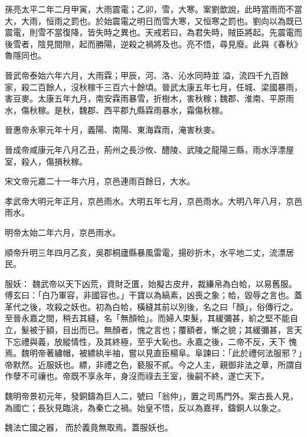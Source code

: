 \begin{pinyinscope}
 孫亮太平二年二月甲寅，大雨震電；乙卯，雪，大寒。案劉歆說，此時當雨而不當大，大雨，恒雨之罰也。於始震電之明日而雪大寒，又恒寒之罰也。劉向以為既已震電，則雪不當復降，皆失時之異也。天戒若曰，為君失時，賊臣將起。先震電而後雪者，陰見間隙，起而勝陽，逆殺之禍將及也。亮不悟，尋見廢。此與《春秋》魯隱同也。



 晉武帝泰始六年六月，大雨霖；甲辰，河、洛、沁水同時並
 溢，流四千九百餘家，殺二百餘人，沒秋稼千三百六十餘頃。晉武太康五年七月，任城、梁國暴雨，害豆麥。太康五年九月，南安霖雨暴雪，折樹木，害秋稼；魏郡、淮南、平原雨水，傷秋稼。是秋，魏郡、西平郡九縣霖雨暴水，霜傷秋稼。



 晉惠帝永寧元年十月，義陽、南陽、東海霖雨，淹害秋麥。



 晉成帝咸康元年八月乙丑，荊州之長沙攸、醴陵、武陵之龍陽三縣，雨水浮漂屋室，殺人，傷損秋稼。



 宋文帝元嘉二十一年六月，京邑連雨百餘日，大水。



 孝武帝大明元年正月，京邑雨水。大明五年七月，京邑雨水。大明八年八月，京邑雨水。



 明帝太始二年六月，京邑雨水。



 順帝升明三年四月乙亥，吳郡桐廬縣暴風雷電，揚砂折木，水平地二丈，流漂居民。



 服妖：
 魏武帝以天下凶荒，資財乏匱，始擬古皮弁，裁縑帛為白帢，以易舊服。傅玄曰：「白乃軍容，非國容也。」干寶以為縞素，凶喪之象；帢，毀辱之言也。蓋革代之後，攻殺之妖也。初為白帢，橫縫其前以別後，名之曰「顏」，俗傳行之。至晉永嘉之間，稍去其縫，名「無顏帢」。而婦人束髮，其緩彌甚，紒之堅不能自立，髮被于額，目出而已。無顏者，愧之言也；覆額者，慚之貌；其緩彌甚，言天下忘禮與義，放縱情性，及其終極，至乎大恥也。永嘉之後，二帝不反，天下
 愧焉。魏明帝著繡帽，被縹紈半袖，嘗以見直臣楊阜。阜諫曰：「此於禮何法服邪？」帝默然。近服妖也。縹，非禮之色，褻服不貳。今之人主，親御非法之章，所謂自作孽不可禳也。帝既不享永年，身沒而祿去王室，後嗣不終，遂亡天下。



 魏明帝景初元年，發銅鑄為巨人二，號曰「翁仲」，置之司馬門外。案古長人見，為國亡；長狄見臨洮，為秦亡之禍。始皇不悟，反以為嘉祥，鑄銅人以象之。



 魏法亡國之器，
 而於義竟無取焉。蓋服妖也。




\end{pinyinscope}
